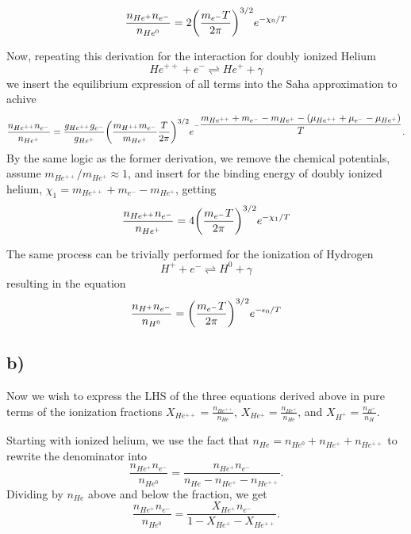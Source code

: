 \documentclass[10pt, a4paper]{article}
\renewcommand{\exp}{e^}
\renewcommand{\exp}{e^}
\begin{document}
\begin{equation}
    \frac{n_{He^+}n_{e^-}}{n_{He^0}} = 2 \qty(\frac{m_{e^-}T}{2\pi})^{3/2} \exp{-\chi_0/T}
\end{equation}

Now, repeating this derivation for the interaction for doubly ionized Helium
\begin{equation}
    He^{++} + e^- \rightleftharpoons He^+ + \gamma
\end{equation}
we insert the equilibrium expression of all terms into the Saha approximation to achive
\begin{equation}
    \frac{n_{He^{++}}n_{e^-}}{n_{He^+}} = \frac{g_{He^{++}}g_{e^-}}{g_{He^+}} \qty(\frac{m_{H^{++}}m_{e^-}}{m_{He^+}}\frac{T}{2\pi})^{3/2} \exp{- \dfrac{m_{He^{++}} + m_{e^-} - m_{He^+} - (\mu_{He^{++}} + \mu_{e^-} - \mu_{He^+})}{T}}.
\end{equation}
By the same logic as the former derivation, we remove the chemical potentials, assume $m_{He^{++}}/m_{He^+} \approx 1$, and insert for the binding energy of doubly ionized helium, $\chi_1 = m_{He^{++}} + m_{e^-} - m_{He^+}$, getting
\begin{equation}
    \frac{n_{He^{++}}n_{e^-}}{n_{He^+}} = 4 \qty(\frac{m_{e^-}T}{2\pi})^{3/2} \exp{-\chi_1/T}
\end{equation}

The same process can be trivially performed for the ionization of Hydrogen
\begin{equation}
    H^{+} + e^- \rightleftharpoons H^0 + \gamma
\end{equation}
resulting in the equation
\begin{equation}
    \frac{n_{H^{+}}n_{e^-}}{n_{H^0}} = \qty(\frac{m_{e^-}T}{2\pi})^{3/2} \exp{-\epsilon_0/T}
\end{equation}


\subsection*{b)}
Now we wish to express the LHS of the three equations derived above in pure terms of the ionization fractions $X_{He^{++}} = \frac{n_{He^{++}}}{n_{He}}$, $X_{He^{+}} = \frac{n_{He^{+}}}{n_{He}}$, and $X_{H^+} = \frac{n_{H^{+}}}{n_{H}}$.

Starting with ionized helium, we use the fact that $n_{He} = n_{He^0} + n_{He^+} + n_{He^{++}}$ to rewrite the denominator into
\begin{equation}
    \frac{n_{He^{+}}n_{e^-}}{n_{He^0}} = 
    \frac{n_{He^{+}}n_{e^-}}{n_{He} - n_{He^+} - n_{He^{++}}}.
\end{equation}
Dividing by $n_{He}$ above and below the fraction, we get
\begin{equation}
    \frac{n_{He^{+}}n_{e^-}}{n_{He^0}} = 
    \frac{X_{He^{+}}n_{e^-}}{1 - X_{He^+} - X_{He^{++}}}.
\end{equation}
\end{document}
